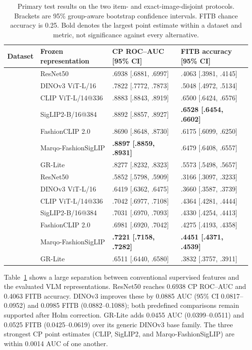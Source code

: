 \documentclass[preprint,12pt]{elsarticle}
\begin{document}
\begin{table}[htbp]
\caption{Primary test results on the two item- and exact-image-disjoint protocols. Brackets are 95\% group-aware bootstrap confidence intervals. FITB chance accuracy is 0.25. Bold denotes the largest point estimate within a dataset and metric, not significance against every alternative.}
\label{tab:main}
\centering\footnotesize\setlength{\tabcolsep}{3.5pt}\renewcommand{\arraystretch}{1.05}
\begin{tabularx}{\textwidth}{@{}>{\raggedright\arraybackslash}p{}>{\raggedright\arraybackslash}p{}>{\centering\arraybackslash}X>{\centering\arraybackslash}X@{}}
\toprule
Dataset & Frozen representation & CP ROC--AUC [95\% CI] & FITB accuracy [95\% CI] \\
\midrule
\multirow{7}{*}{Polyvore-D-Clean}
 & ResNet50 & .6938 [.6881, .6997] & .4063 [.3981, .4145] \\
 & DINOv3 ViT-L/16 & .7822 [.7772, .7873] & .5048 [.4972, .5134] \\
 & CLIP ViT-L/14@336 & .8883 [.8843, .8919] & .6500 [.6424, .6576] \\
 & SigLIP2-B/16@384 & .8892 [.8857, .8927] & \textbf{.6528 [.6454, .6602]} \\
 & FashionCLIP 2.0 & .8690 [.8648, .8730] & .6175 [.6099, .6250] \\
 & Marqo-FashionSigLIP & \textbf{.8897 [.8859, .8931]} & .6479 [.6408, .6557] \\
 & GR-Lite & .8277 [.8232, .8323] & .5573 [.5498, .5657] \\
\midrule
\multirow{7}{*}{IQON3000-Clean}
 & ResNet50 & .5852 [.5798, .5909] & .3166 [.3097, .3233] \\
 & DINOv3 ViT-L/16 & .6419 [.6362, .6475] & .3660 [.3587, .3739] \\
 & CLIP ViT-L/14@336 & .7042 [.6977, .7108] & .4364 [.4281, .4444] \\
 & SigLIP2-B/16@384 & .7031 [.6970, .7093] & .4330 [.4254, .4413] \\
 & FashionCLIP 2.0 & .6981 [.6920, .7042] & .4275 [.4193, .4358] \\
 & Marqo-FashionSigLIP & \textbf{.7221 [.7158, .7282]} & \textbf{.4451 [.4371, .4539]} \\
 & GR-Lite & .6511 [.6440, .6580] & .3832 [.3757, .3911] \\
\bottomrule
\end{tabularx}
\end{table}

Table~\ref{tab:main} shows a large separation between conventional supervised features and the evaluated VLM representations. ResNet50 reaches 0.6938 CP ROC--AUC and 0.4063 FITB accuracy. DINOv3 improves these by 0.0885 AUC (95\% CI 0.0817--0.0952) and 0.0985 FITB (0.0882--0.1088); both predefined comparisons remain supported after Holm correction. GR-Lite adds 0.0455 AUC (0.0399--0.0511) and 0.0525 FITB (0.0425--0.0619) over its generic DINOv3 base family. The three strongest CP point estimates (CLIP, SigLIP2, and Marqo-FashionSigLIP) are within 0.0014 AUC of one another.
\end{document}

